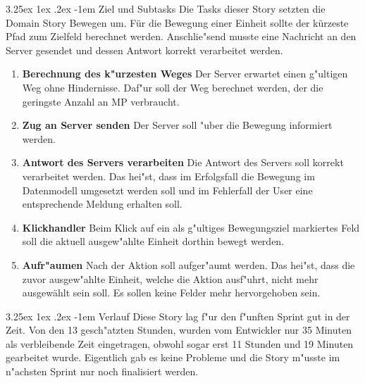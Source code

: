 \documentclass[12pt, titlepage]{scrartcl}
\makeatletter
\renewcommand\paragraph{\@startsection{paragraph}{5}{\z@}%
  {3.25ex \@plus1ex \@minus.2ex}%
  {-1em}%
  {\normalfont\normalsize\bfseries}}
\makeatother
\begin{document}
	            \paragraph{Ziel und Subtasks}
				Die Tasks dieser Story setzten die Domain Story Bewegen um.
	                	F\"ur die Bewegung einer Einheit sollte der k\"urzeste Pfad zum Zielfeld berechnet werden. Anschlie"send musste eine Nachricht an den Server gesendet und dessen Antwort korrekt verarbeitet werden.
	            	\begin{enumerate}[label={}]
	            		\item \textbf{Berechnung des k"urzesten Weges} \hspace{5pt} Der Server erwartet einen g"ultigen Weg ohne Hindernisse. Daf"ur soll der Weg berechnet werden, der die geringste Anzahl an MP verbraucht.
	            		\item \textbf{Zug an Server senden} \hspace{5pt} Der Server soll "uber die Bewegung informiert werden.
	            		\item \textbf{Antwort des Servers verarbeiten} \hspace{5pt} Die Antwort des Servers soll korrekt verarbeitet werden. Das hei"st, dass im Erfolgsfall die Bewegung im Datenmodell umgesetzt werden soll und im Fehlerfall der User eine entsprechende Meldung erhalten soll.
	            		\item \textbf{Klickhandler} \hspace{5pt} Beim Klick auf ein als g"ultiges Bewegungsziel markiertes Feld soll die aktuell ausgew"ahlte Einheit dorthin bewegt werden.
	            		\item \textbf{Aufr"aumen} \hspace{5pt} Nach der Aktion soll aufger"aumt werden. Das hei"st, dass die zuvor ausgew"ahlte Einheit, welche die Aktion ausf"uhrt, nicht mehr ausgew\"ahlt sein soll. Es sollen keine Felder mehr hervorgehoben sein.
	            	\end{enumerate}
            	\paragraph{Verlauf}
            		Diese Story lag f"ur den f"unften Sprint gut in der Zeit. Von den 13 gesch"atzten Stunden, wurden vom Entwickler nur 35 Minuten als verbleibende Zeit eingetragen, obwohl sogar erst 11 Stunden und 19 Minuten gearbeitet wurde. Eigentlich gab es keine Probleme und die Story m"usste im n"achsten Sprint nur noch finalisiert werden.
\end{document}
